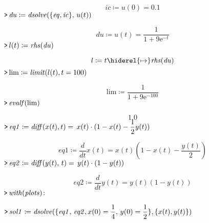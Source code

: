 \documentclass{article}
\begin{document}
\begin{dmath}\label{(7)}
\mathit{ic} \coloneqq u \! \left(0\right)= 0.1
\end{dmath}
\mapleinput
{$ \displaystyle \texttt{>\,} \mathit{du} \coloneqq \mathit{dsolve} (\{\mathit{eq} ,\mathit{ic} \},\,u (t)) $}

\begin{dmath}\label{(8)}
\mathit{du} \coloneqq u \! \left(t \right)=\frac{1}{1+9 {\mathrm e}^{-t}}
\end{dmath}
\mapleinput
{$ \displaystyle \texttt{>\,} l (t)\coloneqq \mathit{rhs} (\mathit{du}) $}

\begin{dmath}\label{(9)}
l \coloneqq t \hiderel{\mapsto }\mathit{rhs} \! \left(\mathit{du} \right)
\end{dmath}
\mapleinput
{$ \displaystyle \texttt{>\,} \mathrm{lim}\coloneqq \mathit{limit} (l (t),t =100)\, $}

\begin{dmath}\label{(10)}
\mathrm{lim}\coloneqq \frac{1}{1+9 {\mathrm e}^{-100}}
\end{dmath}
\mapleinput
{$ \displaystyle \texttt{>\,} \mathit{evalf} (\mathrm{lim}) $}

\begin{dmath}\label{(11)}
 1.0
\end{dmath}
\mapleinput
{$ \displaystyle \texttt{>\,} \mathit{eq1} \coloneqq \mathit{diff} (x (t),t)=\,x (t)\cdot (1-x (t)-\frac{1}{2}y (t)) $}

\begin{dmath}\label{(12)}
\mathit{eq1} \coloneqq \frac{d}{d t}x \! \left(t \right)=x \! \left(t \right) \left(1-x \! \left(t \right)-\frac{y \! \left(t \right)}{2}\right)
\end{dmath}
\mapleinput
{$ \displaystyle \texttt{>\,} \mathit{eq2} \coloneqq \mathit{diff} (y (t),\,t)=\,y (t)\cdot (1-y (t))\, $}

\begin{dmath}\label{(13)}
\mathit{eq2} \coloneqq \frac{d}{d t}y \! \left(t \right)=y \! \left(t \right) \left(1-y \! \left(t \right)\right)
\end{dmath}
\mapleinput
{$ \displaystyle \texttt{>\,} \mathit{with} (\mathit{plots})\colon  $}

\mapleinput
{$ \displaystyle \texttt{>\,} \mathit{sol1} \coloneqq \mathit{dsolve} (\{\mathit{eq1} ,\,\mathit{eq2} ,x (0)=\frac{1}{4},\,y (0)=\frac{1}{2}\},\{x (t),y (t)\}) $}
\end{document}
